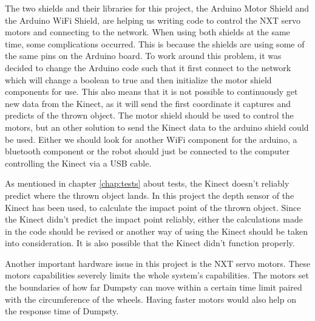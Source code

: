 The two shields and their libraries for this project, the Arduino Motor Shield and the Arduino WiFi Shield, are helping us writing code to control the NXT servo motors and connecting to the network. When using both shields at the same time, some complications occurred. This is because the shields are using some of the same pins on the Arduino board. To work around this problem, it was decided to change the Arduino code such that it first connect to the network which will change a boolean to true and then initialize the motor shield components for use. This also means that it is not possible to continuously get new data from the Kinect, as it will send the first coordinate it captures and predicts of the thrown object. \newline
The motor shield should be used to control the motors, but an other solution to send the Kinect data to the arduino shield could be used. Either we should look for another WiFi component for the arduino, a bluetooth component or the robot should just be connected to the computer controlling the Kinect via a USB cable. 


As mentioned in chapter \ref{chap:tests} about tests, the Kinect doesn’t reliably predict where the thrown object lands. In this project the depth sensor of the Kinect has been used, to calculate the impact point of the thrown object. Since the Kinect didn’t predict the impact point reliably, either the calculations made in the code should be revised or another way of using the Kinect should be taken into consideration. It is also possible that the Kinect didn’t function properly. 


Another important hardware issue in this project is the NXT servo motors. These motors capabilities severely limits the whole system’s capabilities. The motors set the boundaries of how far Dumpsty can move within a certain time limit paired with the circumference of the wheels. Having faster motors would also help on the response time of Dumpsty.


